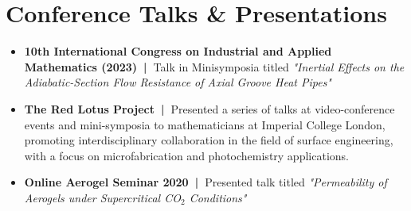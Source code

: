 \documentclass[letterpaper,11pt]{article}
\begin{document}





\EndPubList
\section{Conference Talks \& Presentations}

\newcommand{\TalkList}{\begin{itemize}[leftmargin=0.15in]}
\newcommand{\TalkListEnd}{\end{itemize}\vspace{-5pt}}

\newcommand{\TalkBullet}[2]
{\item\small{\textbf{#1}{#2 \vspace{-7.5pt}}}}

\TalkList
\TalkBullet{10th International Congress on
Industrial and Applied Mathematics (2023)~|~}{Talk in Minisymposia titled \textit{"Inertial Effects on the Adiabatic-Section Flow Resistance of Axial Groove Heat Pipes"}}
\TalkBullet{The Red Lotus Project~|~}{Presented a series of talks at video-conference events and mini-symposia to mathematicians at Imperial College London, promoting interdisciplinary collaboration in the field of surface engineering, with a focus on microfabrication and photochemistry applications.}
\TalkBullet{Online Aerogel Seminar 2020~|~}{Presented talk titled \textit{"Permeability of Aerogels under Supercritical CO$_2$ Conditions"}}

\TalkListEnd





\end{document}
